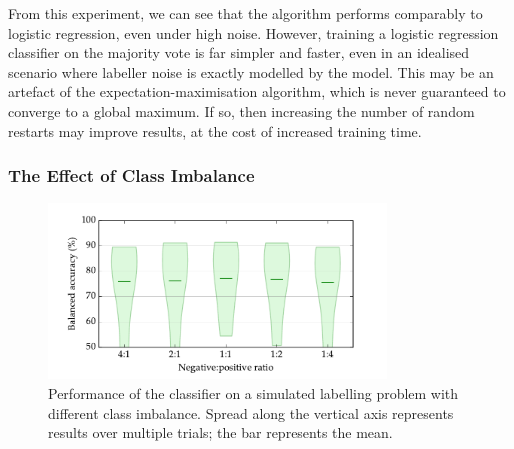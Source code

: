             From this experiment, we can see that the \citeauthor{raykar10}
            algorithm performs comparably to logistic regression, even under
            high noise. However, training a logistic regression classifier on
            the majority vote is far simpler and faster, even in an idealised
            scenario where labeller noise is exactly modelled by the
            \citeauthor{raykar10} model. This may be an artefact of the
            expectation-maximisation algorithm, which is never guaranteed to
            converge to a global maximum. If so, then increasing the number of
            random restarts may improve results, at the cost of increased
            training time.

        \subsubsection{The Effect of Class Imbalance}

            \begin{figure}
                \centering
                \includegraphics[width=0.8\textwidth]
                    {images/experiments/raykar_class_balance_ba}
                \caption{Performance of the \citeauthor{raykar10} classifier on
                    a simulated labelling problem with different class
                    imbalance. Spread along the vertical axis represents results
                    over multiple trials; the bar represents the mean.}
                \label{fig:raykar-class-balance-ba}
            \end{figure}

